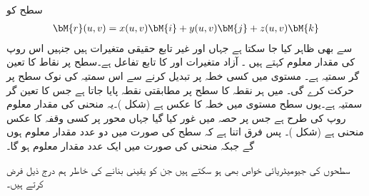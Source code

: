 سطح  کو 
\begin{align}\label{مساوات_خطی_تکمل_سطح_مقدار_معلوم_روپ}
\bM{r}(u,v)=x(u,v)\bM{i}+y(u,v)\bM{j}+z(u,v)\bM{k}
\end{align}
سے بھی ظاہر کیا جا سکتا ہے جہاں  اور  غیر تابع حقیقی متغیرات ہیں جنہیں اس روپ کی مقدار معلوم کہتے ہیں ۔  آزاد متغیرات  اور  کا تابع تفاعل  ہے۔سطح  پر نقاط کا تعین گر سمتیہ  ہے۔ مستوی  میں کسی خطہ  پر  تبدیل کرنے سے اس سمتیہ کی نوک سطح  پر حرکت کرے گی۔  میں ہر نقطہ  کا سطح  پر مطابقتی نقطہ پایا جاتا ہے جس کا تعین گر سمتیہ  ہے۔یوں سطح  مستوی  میں خطہ  کا عکس ہے (شکل )۔یہ منحنی  کی مقدار معلوم روپ  کی طرح ہے جس پر حصہ  میں غور کیا گیا جہاں  محور  پر کسی وقفہ کا عکس منحنی  ہے (شکل )۔ پس فرق اتنا ہے کہ سطح کی صورت میں دو عدد مقدار معلوم ہوں گے جبکہ منحنی کی صورت میں ایک عدد مقدار معلوم ہو گا۔

سطحوں کی  جیومیٹریائی خواص بھی ہو سکتے ہیں جن کو یقینی بنانے کی خاطر ہم درج ذیل فرض کرتے ہیں۔

